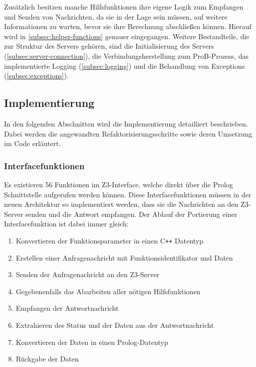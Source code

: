 Zusätzlich besitzen manche Hilfsfunktionen ihre eigene Logik zum Empfangen und Senden von Nachrichten,
da sie in der Lage sein müssen, auf weitere Informationen zu warten, bevor sie ihre Berechnung abschließen können.
Hierauf wird in \cref{subsec:helper-functions} genauer eingegangen.
Weitere Bestandteile, die zur Struktur des Servers gehören, sind die Initialisierung des Servers (\cref{subsec:server-connection}), die Verbindungsherstellung zum ProB-Prozess,
das implementierte Logging (\cref{subsec:logging}) und die Behandlung von Exceptions (\cref{subsec:exceptions}).
\vspace{3em}
\subsection{Implementierung}

In den folgenden Abschnitten wird die Implementierung detailliert beschrieben.
Dabei werden die angewandten Refaktorisierungsschritte sowie deren Umsetzung im Code erläutert.
\clearpage
\subsubsection{Interfacefunktionen}

Es existieren 56 Funktionen im Z3-Interface, welche direkt über die Prolog Schnittstelle aufgerufen werden können.
Diese Interfacefunktionen müssen in der neuen Architektur so implementiert werden, dass sie die Nachrichten an den Z3-Server senden und die Antwort empfangen.
Der Ablauf der Portierung einer Interfacefunktion ist dabei immer gleich:

\begin{enumerate}
  \item Konvertieren der Funktionsparameter in einen C\texttt{++} Datentyp
  \item Erstellen einer Anfragenachricht mit Funktionsidentifikator und Daten
  \item Senden der Anfragenachricht an den Z3-Server
  \item Gegebenenfalls das Abarbeiten aller nötigen Hilfsfunktionen
  \item Empfangen der Antwortnachricht
  \item Extrahieren des Status und der Daten aus der Antwortnachricht
  \item Konvertieren der Daten in einen Prolog-Datentyp
  \item Rückgabe der Daten
\end{enumerate}

